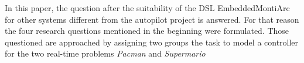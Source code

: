 In this paper, the question after the suitability of the DSL EmbeddedMontiArc for other systems different from the autopilot project is answered. For that reason the four research questions mentioned in the beginning were formulated. Those questioned are approached by assigning two groups the task to model a controller for the two real-time problems \textit{Pacman} and \textit{Supermario} 
